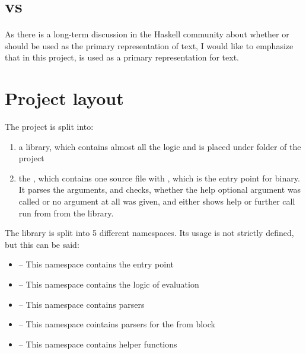 \section{ vs }
As there is a long-term discussion in the Haskell community about whether  or  should be used as the 
primary representation of text, I would like to emphasize that in this project,  is used as a primary
representation for text.

\section{Project layout}

The project is split into:
\begin{enumerate}
  \item a library, which contains almost all the logic and is placed under
        folder of the project

  \item the , which contains one source file
      with , which is the entry point for  binary. 
      It parses the arguments, and checks, whether the help optional argument was called or no argument at all was given, 
      and either shows help or further call run from  from the library.
\end{enumerate}

The library is split into 5 different namespaces. Its usage is not strictly defined, but this can be said:
\begin{itemize}
    \item {} -- This namespace contains the entry point
    \item {} -- This namespace contains the logic of evaluation
    \item {} -- This namespace contains parsers
    \item {} -- This namespace cointains parsers for the from block
    \item {} -- This namespace contains helper functions
\end{itemize}

